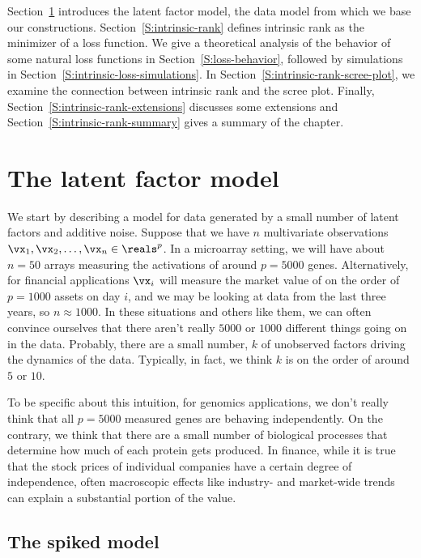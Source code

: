 Section~\ref{S:latent-factor-model} introduces the latent factor model, the
data model from which we base our constructions.
Section~\ref{S:intrinsic-rank} defines intrinsic rank as the minimizer of a
loss function. We give a theoretical analysis of the behavior of some natural
loss functions in Section~\ref{S:loss-behavior}, followed by simulations in
Section~\ref{S:intrinsic-loss-simulations}. In
Section~\ref{S:intrinsic-rank-scree-plot}, we examine the connection between
intrinsic rank and the scree plot. Finally,
Section~\ref{S:intrinsic-rank-extensions} discusses some extensions and
Section~\ref{S:intrinsic-rank-summary} gives a summary of the chapter.


\section{The latent factor model}\label{S:latent-factor-model}

We start by describing a model for data generated by a small number of latent
factors and additive noise. Suppose that we have $n$ multivariate observations
$\vx_{1}, \vx_{2}, \ldots, \vx_{n} \in \reals^p$. In a microarray setting, we
will have about $n=50$ arrays measuring the activations of around $p=5000$
genes. Alternatively, for financial applications $\vx_i$ will measure the
market value of on the order of $p=1000$ assets on day $i$, and we may be looking at
data from the last three years, so $n \approx 1000$. In these situations and
others like them, we can often convince ourselves that there aren't really
$5000$ or $1000$ different things going on in the data. Probably, there are a small number, $k$ of unobserved factors driving the dynamics of the data. Typically, in fact, we think $k$ is on the order of around $5$ or $10$.

To be specific about this intuition, for genomics applications, we don't
really think that all $p=5000$ measured genes are behaving independently. On
the contrary, we think that there are a small number of biological processes
that determine how much of each protein gets produced. In finance, while it is
true that the stock prices of individual companies have a certain degree of
independence, often macroscopic effects like industry- and market-wide trends
can explain a substantial portion of the value.

\subsection{The spiked model}

